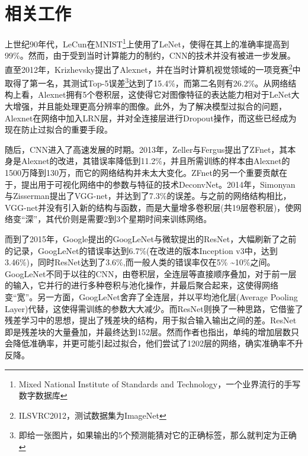 \chapter{相关工作}

上世纪90年代，LeCun在MNIST\footnote{Mixed National Institute of Standards and Technology，一个业界流行的手写数字数据库}上使用了LeNet，使得在其上的准确率提高到99\%。然而，由于受到当时计算能力的制约，CNN的技术并没有被进一步发展。直至2012年，Krizhevsky提出了Alexnet，并在当时计算机视觉领域的一项竞赛\footnote{ILSVRC2012，测试数据集为ImageNet}中取得了第一名，其测试Top-5误差\footnote{即给一张图片，如果输出的5个预测能猜对它的正确标签，那么就判定为正确}达到了15.4\%，而第二名则有26.2\%。从网络结构上看，Alexnet拥有5个卷积层，这使得它对图像特征的表达能力相对于LeNet大大增强，并且能处理更高分辨率的图像。此外，为了解决模型过拟合的问题，Alexnet在网络中加入LRN层，并对全连接层进行Dropout操作，而这些已经成为现在防止过拟合的重要手段。

随后，CNN进入了高速发展的时期。2013年，Zeller与Fergus提出了ZFnet，其本身是Alexnet的改进，其错误率降低到11.2\%，并且所需训练的样本由Alexnet的1500万降到130万，而它的网络结构并未太大变化。ZFnet的另一个重要贡献在于，提出用于可视化网络中的参数与特征的技术DeconvNet。2014年，Simonyan与Zisserman提出了VGG-net，并达到了7.3\%的误差。与之前的网络结构相比，VGG-net并没有引入新的结构与函数，而是大量增多卷积层(共19层卷积层)，使网络变“深”，其代价则是需要2到3个星期时间来训练网络。

而到了2015年，Google提出的GoogLeNet与微软提出的ResNet，大幅刷新了之前的记录，GoogLeNet的错误率达到6.7\%(在改进的版本Inception v3中，达到3.46\%)，同时ResNet达到了3.6\%,而一般人类的错误率仅在5\% \textasciitilde 10\%之间。GoogLeNet不同于以往的CNN，由卷积层，全连层等直接顺序叠加，对于前一层的输入，它并行的进行多种卷积与池化操作，并最后聚合起来，这使得网络变“宽”。另一方面，GoogLeNet舍弃了全连层，并以平均池化层(Average Pooling Layer)代替，这使得需训练的参数大大减少。而ResNet则换了一种思路，它借鉴了残差学习中的思想，提出了残差块的结构，用于拟合输入输出之间的差。ResNet即是残差块的大量叠加，并最终达到152层。然而作者也指出，单纯的增加层数只会降低准确率，并更可能引起过拟合，他们尝试了1202层的网络，确实准确率不升反降。